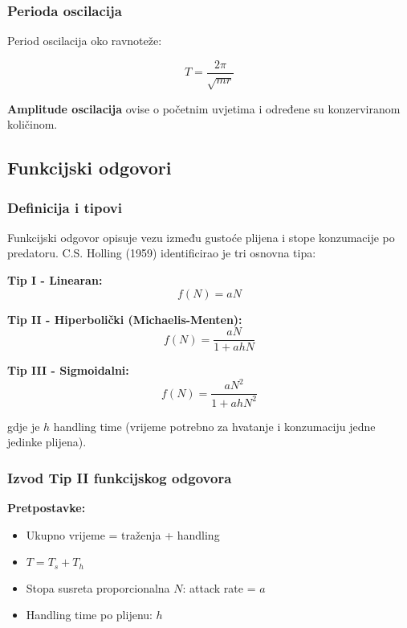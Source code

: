 \documentclass[11pt,oneside]{book}
\begin{document}
\subsubsection{Perioda oscilacija}

Period oscilacija oko ravnoteže:

\begin{equation}
	T = \frac{2\pi}{\sqrt{mr}}
\end{equation}

\textbf{Amplitude oscilacija} ovise o početnim uvjetima i određene su konzerviranom količinom.

\subsection{Funkcijski odgovori}

\subsubsection{Definicija i tipovi}

Funkcijski odgovor opisuje vezu između gustoće plijena i stope konzumacije po predatoru. C.S. Holling (1959) identificirao je tri osnovna tipa:

\textbf{Tip I - Linearan:}
\begin{equation}
	f(N) = aN
\end{equation}

\textbf{Tip II - Hiperbolički (Michaelis-Menten):}
\begin{equation}
	f(N) = \frac{aN}{1 + ahN}
\end{equation}

\textbf{Tip III - Sigmoidalni:}
\begin{equation}
	f(N) = \frac{aN^2}{1 + ahN^2}
\end{equation}

gdje je $h$ handling time (vrijeme potrebno za hvatanje i konzumaciju jedne jedinke plijena).

\subsubsection{Izvod Tip II funkcijskog odgovora}

\textbf{Pretpostavke:}
\begin{itemize}
	\item Ukupno vrijeme = traženja + handling
	\item $T = T_s + T_h$
	\item Stopa susreta proporcionalna $N$: attack rate = $a$
	\item Handling time po plijenu: $h$
\end{itemize}
\end{document}
